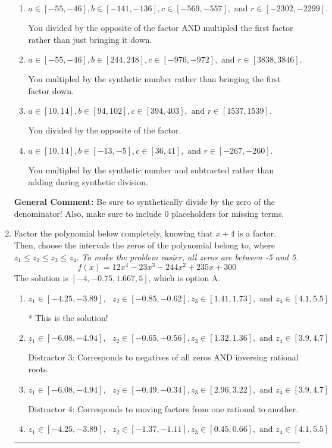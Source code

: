 \documentclass{extbook}[14pt]
\newcommand{\litem}[1]{\item #1

\rule{\textwidth}{0.4pt}}
\begin{document}
\begin{enumerate}
{\begin{enumerate}[label=\Alph*.]
* This is the solution!
\item \( a \in [-55, -46], b \in [-141, -136], c \in [-569, -557], \text{ and } r \in [-2302, -2299]. \)

 You divided by the opposite of the factor AND multipled the first factor rather than just bringing it down.
\item \( a \in [-55, -46], b \in [244, 248], c \in [-976, -972], \text{ and } r \in [3838, 3846]. \)

 You multipled by the synthetic number rather than bringing the first factor down.
\item \( a \in [10, 14], b \in [94, 102], c \in [394, 403], \text{ and } r \in [1537, 1539]. \)

 You divided by the opposite of the factor.
\item \( a \in [10, 14], b \in [-13, -5], c \in [36, 41], \text{ and } r \in [-267, -260]. \)

 You multipled by the synthetic number and subtracted rather than adding during synthetic division.
\end{enumerate}

\textbf{General Comment:} Be sure to synthetically divide by the zero of the denominator! Also, make sure to include 0 placeholders for missing terms.
}
\litem{
Factor the polynomial below completely, knowing that $x + 4$ is a factor. Then, choose the intervals the zeros of the polynomial belong to, where $z_1 \leq z_2 \leq z_3 \leq z_4$. \textit{To make the problem easier, all zeros are between -5 and 5.}
\[ f(x) = 12x^{4} -23 x^{3} -244 x^{2} +235 x + 300 \]The solution is \( [-4, -0.75, 1.667, 5] \), which is option A.\begin{enumerate}[label=\Alph*.]
\item \( z_1 \in [-4.25, -3.89], \text{   }  z_2 \in [-0.85, -0.62], z_3 \in [1.41, 1.73], \text{   and   } z_4 \in [4.1, 5.5] \)

* This is the solution!
\item \( z_1 \in [-6.08, -4.94], \text{   }  z_2 \in [-0.65, -0.56], z_3 \in [1.32, 1.36], \text{   and   } z_4 \in [3.9, 4.7] \)

 Distractor 3: Corresponds to negatives of all zeros AND inversing rational roots.
\item \( z_1 \in [-6.08, -4.94], \text{   }  z_2 \in [-0.49, -0.34], z_3 \in [2.96, 3.22], \text{   and   } z_4 \in [3.9, 4.7] \)

 Distractor 4: Corresponds to moving factors from one rational to another.
\item \( z_1 \in [-4.25, -3.89], \text{   }  z_2 \in [-1.37, -1.11], z_3 \in [0.45, 0.66], \text{   and   } z_4 \in [4.1, 5.5] \)


\end{enumerate}}
\end{enumerate}
\end{document}
